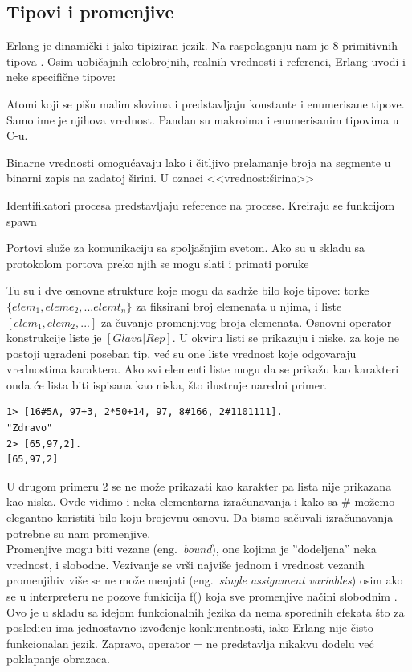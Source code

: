 \documentclass[a4paper]{article}
\begin{document}
\subsection{Tipovi i promenjive}
Erlang je dinamički i jako tipiziran jezik. 
Na raspolaganju nam je 8 primitivnih tipova \cite{phdthesis}. 
Osim uobičajnih celobrojnih, realnih vrednosti i referenci, Erlang uvodi i neke specifične tipove:
\begin{list}{•}{}
\item Atomi koji se pišu malim slovima i predstavljaju konstante i enumerisane tipove. Samo ime je njihova vrednost. Pandan su makroima i enumerisanim tipovima u C-u.
\item Binarne vrednosti omogućavaju lako i čitljivo prelamanje broja na segmente u binarni zapis na zadatoj širini. U oznaci <<vrednost:širina>>
\item Identifikatori procesa predstavljaju reference na procese. Kreiraju se funkcijom spawn
\item Portovi služe za komunikaciju sa spoljašnjim svetom. Ako su u skladu sa protokolom portova preko njih se mogu slati i primati poruke
\end{list}
 
Tu su i dve osnovne strukture koje mogu da sadrže bilo koje tipove: torke $\{elem_1, eleme_2, ... elemt_n\}$ za fiksirani broj elemenata u njima, 
i liste $[elem_1, elem_2, ...]$ za čuvanje promenjivog broja elemenata. 
Osnovni operator konstrukcije liste je $[Glava | Rep]$. 
U okviru listi se prikazuju i niske, za koje ne postoji ugrađeni poseban tip, 
već su one liste vrednost koje odgovaraju vrednostima karaktera. Ako svi elementi liste mogu da se prikažu kao karakteri onda će lista biti ispisana kao niska, što ilustruje naredni primer.
\begin{verbatim}
1> [16#5A, 97+3, 2*50+14, 97, 8#166, 2#1101111].
"Zdravo"
2> [65,97,2].
[65,97,2]
\end{verbatim}
U drugom primeru 2 se ne može prikazati kao karakter pa lista nije prikazana kao niska. 
Ovde vidimo i neka elementarna izračunavanja i kako sa \# možemo elegantno koristiti bilo koju brojevnu osnovu. 
Da bismo sačuvali izračunavanja potrebne su nam promenjive.\\

Promenjive mogu biti vezane (eng.~{\em bound}), one kojima je ''dodeljena'' neka vrednost, i slobodne. 
Vezivanje se vrši najviše jednom i vrednost vezanih promenjihiv više se ne može menjati (eng.~{\em single assignment variables}) 
osim ako se u interpreteru ne pozove funkicija f() koja sve promenjive načini slobodnim \cite{book_fred}. 
Ovo je u skladu sa idejom funkcionalnih jezika da nema sporednih efekata 
što za posledicu ima jednostavno izvođenje konkurentnosti, 
iako Erlang nije čisto funkcionalan jezik.
Zapravo, operator = ne predstavlja nikakvu dodelu već poklapanje obrazaca.
\end{document}
